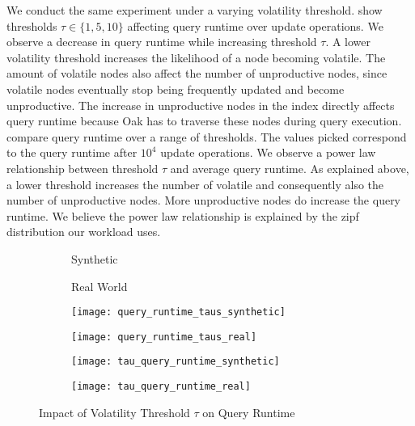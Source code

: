 \documentclass[abstracton,12pt]{scrartcl}
\theoremstyle{definition}
\begin{document}
We conduct the same experiment under a varying volatility threshold. 
 show
thresholds $\tau \in \{1,5,10\}$ affecting query runtime
over update operations. We observe a decrease in query runtime
while increasing threshold $\tau$.
A lower volatility threshold increases the likelihood of a node
becoming volatile. The amount of volatile nodes also affect the number of
unproductive nodes, since volatile nodes eventually stop being frequently
updated and become unproductive. The increase in unproductive nodes in the index
directly affects query runtime because Oak has to traverse these nodes during
query execution.
 compare query
runtime over a range of thresholds. The values picked correspond to
the query runtime after $10^4$ update operations.
We observe a power law relationship between threshold $\tau$ and average query
runtime. As explained above, a lower threshold increases the number of volatile
and consequently also the number of unproductive nodes. More unproductive nodes
do increase the query runtime. We believe the power law relationship is
explained by the zipf distribution our workload uses. 

\begin{figure}
  \centering
  \begin{subfigure}{0.49\linewidth}
    \centering
    Synthetic
  \end{subfigure}
  \begin{subfigure}{0.49\linewidth}
    \centering
    Real World
  \end{subfigure}
  \begin{subfigure}{0.49\linewidth}
    \centering
    \texttt{[image: query\_runtime\_taus\_synthetic]}
    \caption{}
    \label{fig:query_runtime_taus_synthetic}
  \end{subfigure}
  \begin{subfigure}{0.49\linewidth}
    \centering
    \texttt{[image: query\_runtime\_taus\_real]}
    \caption{}
    \label{fig:query_runtime_taus_real}
  \end{subfigure}
  \begin{subfigure}{0.49\linewidth}
    \centering
    \texttt{[image: tau\_query\_runtime\_synthetic]}
    \caption{}
    \label{fig:tau_query_runtime_synthetic}
  \end{subfigure}
  \begin{subfigure}{0.49\linewidth}
    \centering
    \texttt{[image: tau\_query\_runtime\_real]}
    \caption{}
    \label{fig:tau_query_runtime_real}
  \end{subfigure}
\caption{Impact of Volatility Threshold $\tau$ on Query Runtime}
\end{figure}
\end{document}
